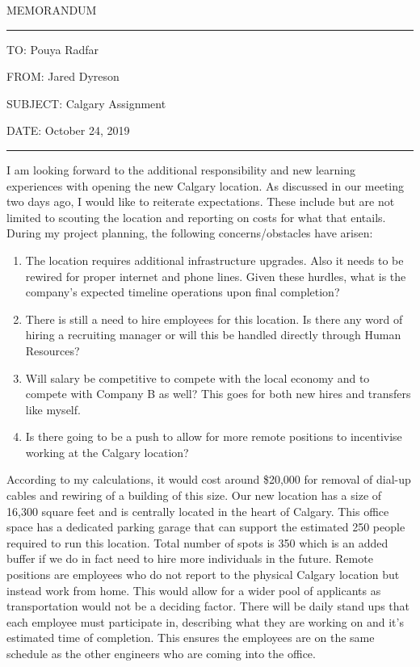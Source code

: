 \documentclass{article}
\begin{document}
\doublespacing

\begin{center}
MEMORANDUM
\end{center}

\par\noindent\rule{\textwidth}{0.4pt}

\begin{flushleft}
TO: Pouya Radfar

FROM: Jared Dyreson

SUBJECT: Calgary Assignment

DATE: October 24, 2019
\end{flushleft}

\par\noindent\rule{\textwidth}{0.4pt}

I am looking forward to the additional responsibility and new learning experiences with opening the new Calgary location. As discussed in our meeting two days ago, I would like to reiterate expectations. These include but are not limited to scouting the location and reporting on costs for what that entails. 
During my project planning, the following concerns/obstacles have arisen: 

\begin{enumerate}
\item The location requires additional infrastructure upgrades. Also it needs to be rewired for proper internet and phone lines. Given these hurdles, what is the company's expected timeline operations upon final completion?
\item There is still a need to hire employees for this location. Is there any word of hiring a recruiting manager or will this be handled directly through Human Resources?
\item Will salary be competitive to compete with the local economy and to compete with Company B as well? This goes for both new hires and transfers like myself.
\item Is there going to be a push to allow for more remote positions to incentivise working at the Calgary location?

\end{enumerate}

According to my calculations, it would cost around \$20,000 for removal of dial-up cables and rewiring of a building of this size.
Our new location has a size of 16,300 square feet and is centrally located in the heart of Calgary.
This office space has a dedicated parking garage that can support the estimated 250 people required to run this location.
Total number of spots is 350 which is an added buffer if we do in fact need to hire more individuals in the future.
Remote positions are employees who do not report to the physical Calgary location but instead work from home. This would allow for a wider pool of applicants as transportation would not be a deciding factor.
There will be daily stand ups that each employee must participate in, describing what they are working on and it's estimated time of completion.
This ensures the employees are on the same schedule as the other engineers who are coming into the office.
\end{document}
